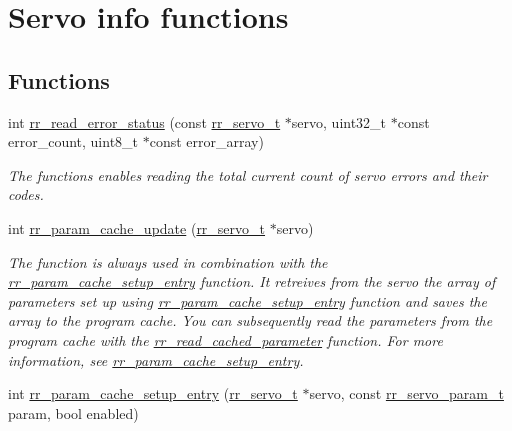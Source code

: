 \hypertarget{group___servo__info}{}\section{Servo info functions}
\label{group___servo__info}
\subsection*{Functions}
\begin{DoxyCompactItemize}
\item 
int \hyperlink{group___servo__info_ga0803e0fab3e22b1bcb3f51aa393328b4}{rr\+\_\+read\+\_\+error\+\_\+status} (const \hyperlink{structrr__servo__t}{rr\+\_\+servo\+\_\+t} $\ast$servo, uint32\+\_\+t $\ast$const error\+\_\+count, uint8\+\_\+t $\ast$const error\+\_\+array)
\begin{DoxyCompactList}\small\item\em The functions enables reading the total current count of servo errors and their codes. \end{DoxyCompactList}\item 
int \hyperlink{group___servo__info_ga4d9f2bcfc136357405359c9ca9d4aedf}{rr\+\_\+param\+\_\+cache\+\_\+update} (\hyperlink{structrr__servo__t}{rr\+\_\+servo\+\_\+t} $\ast$servo)
\begin{DoxyCompactList}\small\item\em The function is always used in combination with the \hyperlink{group___servo__info_ga770c1e8b4d868cea649592e26a2706dd}{rr\+\_\+param\+\_\+cache\+\_\+setup\+\_\+entry} function. It retreives from the servo the array of parameters set up using \hyperlink{group___servo__info_ga770c1e8b4d868cea649592e26a2706dd}{rr\+\_\+param\+\_\+cache\+\_\+setup\+\_\+entry} function and saves the array to the program cache. You can subsequently read the parameters from the program cache with the \hyperlink{group___servo__info_ga9249202a29031f84b7dc3da37db05dfc}{rr\+\_\+read\+\_\+cached\+\_\+parameter} function. For more information, see \hyperlink{group___servo__info_ga770c1e8b4d868cea649592e26a2706dd}{rr\+\_\+param\+\_\+cache\+\_\+setup\+\_\+entry}. \end{DoxyCompactList}\item 
int \hyperlink{group___servo__info_ga770c1e8b4d868cea649592e26a2706dd}{rr\+\_\+param\+\_\+cache\+\_\+setup\+\_\+entry} (\hyperlink{structrr__servo__t}{rr\+\_\+servo\+\_\+t} $\ast$servo, const \hyperlink{api_8h_aa1f58887fab4642cf49f6f453c1d276d}{rr\+\_\+servo\+\_\+param\+\_\+t} param, bool enabled)

\end{DoxyCompactItemize}
